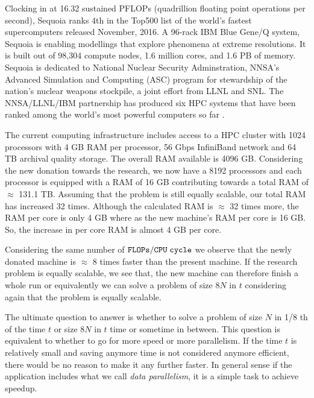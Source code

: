 \documentclass[fleqn,letterpaper,12pt]{report}
\begin{document}
Clocking in at 16.32 sustained PFLOPs (quadrillion floating point operations per second), Sequoia ranks 4th in the Top500 list of the world's fastest supercomputers released November, 2016. A 96-rack IBM Blue Gene/Q system, Sequoia is enabling modellings that explore phenomena at extreme resolutions. It is built out of 98,304 compute nodes, 1.6 million cores, and 1.6 PB of memory. Sequoia is dedicated to National Nuclear Security Adminstration, NNSA's Advanced Simulation and Computing (ASC) program for stewardship of the nation's nuclear weapons stockpile, a joint effort from LLNL and SNL. The NNSA/LLNL/IBM partnership has produced six HPC systems that have been ranked among the world's most powerful computers so far \cite{sequoia}. 
\newpage
{}
{}
\problem
The current computing infrastructure includes access to a HPC cluster with 1024 processors with 4 GB RAM per processor, 56 Gbps InfiniBand network and 64 TB archival quality storage. The overall RAM available is 4096 GB. Considering the new donation towards the research, we now have a 8192 processors and each processor is equipped with a RAM of 16 GB contributing towards a total RAM of $\approx$ 131.1 TB. Assuming that the problem is still equally scalable, our total RAM has increased 32 times. Although the calculated RAM is $\approx$ 32 times more, the RAM per core is only 4 GB where as the new machine's RAM per core is 16 GB. So, the increase in per core RAM is almost 4 GB per core. 

Considering the same number of $\tt{FLOPs/CPU \; cycle}$ we observe that the newly donated machine is $\approx$ 8 times faster than the present machine. If the research problem is equally scalable, we see that, the new machine can therefore finish a whole run or equivalently we can solve a problem of size $8N$ in $t$ considering again that the problem is equally scalable.

The ultimate question to answer is whether to solve a problem of size $N$ in 1/8 th of the time $t$ or size $8N$ in $t$ time or sometime in between. This question is equivalent to whether to go for more speed or more parallelism. If the time $t$ is relatively small and saving anymore time is not considered anymore efficient, there would be no reason to make it any further faster. In general sense if the application includes what we call \emph{data parallelism}, it is a simple task to achieve speedup. 
\end{document}
